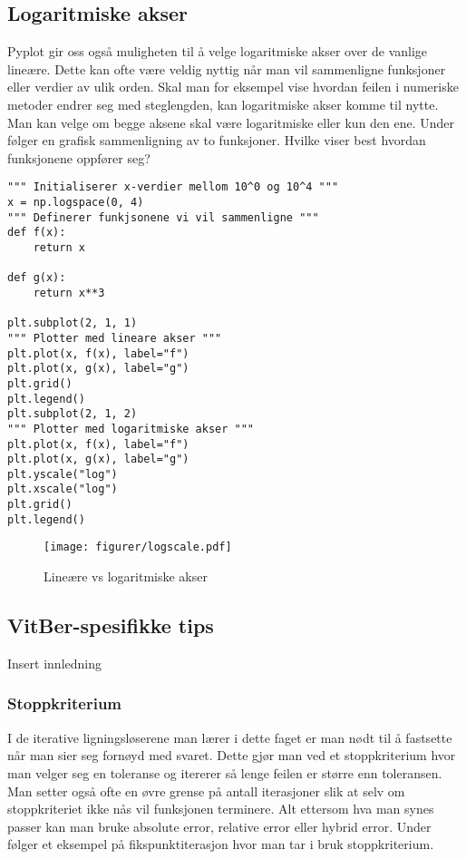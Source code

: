 \documentclass[a4paper,12pt]{article}
\begin{document}
\subsection{Logaritmiske akser}
Pyplot gir oss også muligheten til å velge logaritmiske akser over de vanlige lineære. Dette kan ofte være veldig nyttig når man vil sammenligne funksjoner eller verdier av ulik orden. Skal man for eksempel vise hvordan feilen i numeriske metoder endrer seg med steglengden, kan logaritmiske akser komme til nytte. Man kan velge om begge aksene skal være logaritmiske eller kun den ene. Under følger en grafisk sammenligning av to funksjoner. Hvilke viser best hvordan funksjonene oppfører seg?

\begin{lstlisting}
""" Initialiserer x-verdier mellom 10^0 og 10^4 """
x = np.logspace(0, 4) 
""" Definerer funkjsonene vi vil sammenligne """
def f(x):
    return x 

def g(x):
    return x**3

plt.subplot(2, 1, 1)
""" Plotter med lineare akser """
plt.plot(x, f(x), label="f")
plt.plot(x, g(x), label="g")
plt.grid()
plt.legend()
plt.subplot(2, 1, 2)
""" Plotter med logaritmiske akser """
plt.plot(x, f(x), label="f")
plt.plot(x, g(x), label="g")
plt.yscale("log")
plt.xscale("log")
plt.grid()
plt.legend()
\end{lstlisting}

\begin{figure}[ht]
    \centering
    \texttt{[image: figurer/logscale.pdf]}
    \caption{Lineære vs logaritmiske akser}
    \label{fig:logscale.pdf}
\end{figure}


\subsection{VitBer-spesifikke tips}
Insert innledning

\subsubsection{Stoppkriterium}
I de iterative ligningsløserene man lærer i dette faget er man nødt til å fastsette når man sier seg fornøyd med svaret. Dette gjør man ved et stoppkriterium hvor man velger seg en toleranse og itererer så lenge feilen er større enn toleransen. Man setter også ofte en øvre grense på antall iterasjoner slik at selv om stoppkriteriet ikke nås vil funksjonen terminere. Alt ettersom hva man synes passer kan man bruke absolute error, relative error eller hybrid error. Under følger et eksempel på fikspunktiterasjon hvor man tar i bruk stoppkriterium.
\end{document}
